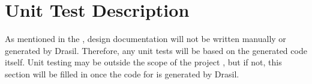 \documentclass[12pt, titlepage]{article}
\newcounter{testnum} %
\begin{document}
\section{Unit Test Description} \label{sec_unit_tests}

As mentioned in the , design documentation will not be
written manually or generated by Drasil. Therefore, any unit tests will be
based on the generated code itself. Unit testing may be outside the scope of
the \progname{} project , but if not, this section will be
filled in once the code for \progname{} is generated by Drasil.








\end{document}
